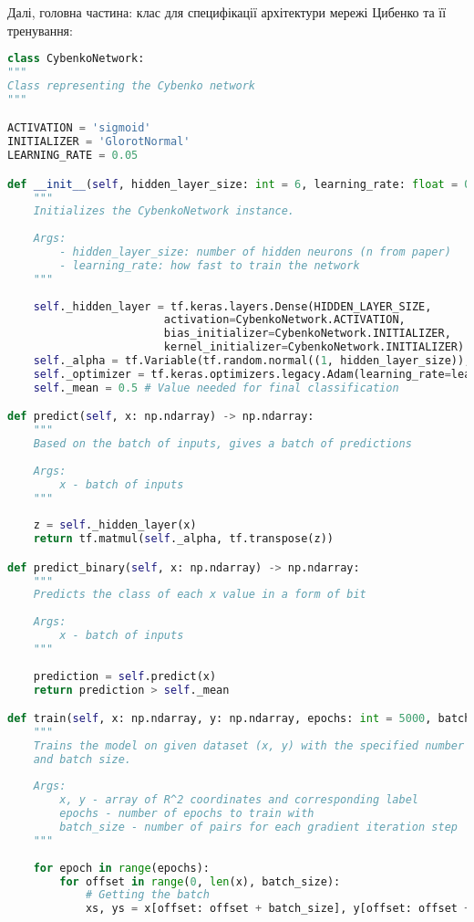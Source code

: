 Далі, головна частина: клас для специфікації архітектури мережі Цибенко та її тренування:
\begin{lstlisting}[language=Python]
class CybenkoNetwork:
"""
Class representing the Cybenko network
"""

ACTIVATION = 'sigmoid'
INITIALIZER = 'GlorotNormal'
LEARNING_RATE = 0.05

def __init__(self, hidden_layer_size: int = 6, learning_rate: float = 0.05) -> None:
    """
    Initializes the CybenkoNetwork instance.
    
    Args:
        - hidden_layer_size: number of hidden neurons (n from paper)
        - learning_rate: how fast to train the network
    """
    
    self._hidden_layer = tf.keras.layers.Dense(HIDDEN_LAYER_SIZE, 
                        activation=CybenkoNetwork.ACTIVATION, 
                        bias_initializer=CybenkoNetwork.INITIALIZER,
                        kernel_initializer=CybenkoNetwork.INITIALIZER)
    self._alpha = tf.Variable(tf.random.normal((1, hidden_layer_size)), name='alpha')
    self._optimizer = tf.keras.optimizers.legacy.Adam(learning_rate=learning_rate)
    self._mean = 0.5 # Value needed for final classification

def predict(self, x: np.ndarray) -> np.ndarray:
    """
    Based on the batch of inputs, gives a batch of predictions
    
    Args:
        x - batch of inputs
    """
    
    z = self._hidden_layer(x)
    return tf.matmul(self._alpha, tf.transpose(z))

def predict_binary(self, x: np.ndarray) -> np.ndarray:
    """
    Predicts the class of each x value in a form of bit
    
    Args:
        x - batch of inputs
    """
    
    prediction = self.predict(x)
    return prediction > self._mean

def train(self, x: np.ndarray, y: np.ndarray, epochs: int = 5000, batch_size: int = 1024) -> None:
    """
    Trains the model on given dataset (x, y) with the specified number of epochs 
    and batch size.
    
    Args:
        x, y - array of R^2 coordinates and corresponding label
        epochs - number of epochs to train with
        batch_size - number of pairs for each gradient iteration step
    """
    
    for epoch in range(epochs):
        for offset in range(0, len(x), batch_size):
            # Getting the batch
            xs, ys = x[offset: offset + batch_size], y[offset: offset + batch_size]


\end{lstlisting}
